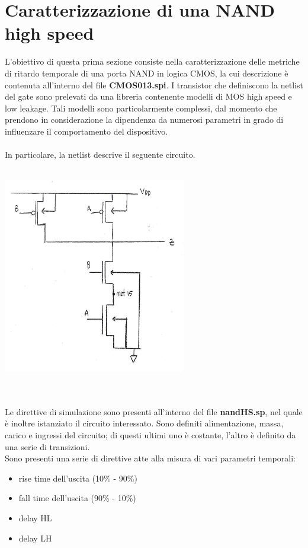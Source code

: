 \documentclass[11pt,  english, makeidx, a4paper, titlepage, oneside]{book}
\begin{document}
\section{Caratterizzazione di una NAND high speed}
L'obiettivo di questa prima sezione consiste nella caratterizzazione delle metriche di ritardo temporale di una porta NAND in logica CMOS, la cui descrizione è contenuta all'interno del file \textbf{CMOS013.spi}.
I transistor che definiscono la netlist del gate sono prelevati da una libreria contenente modelli di MOS high speed e low leakage. Tali modelli sono particolarmente complessi, dal momento che prendono in considerazione la dipendenza da numerosi parametri in grado di influenzare il comportamento del dispositivo.
\\\\
In particolare, la netlist descrive il seguente circuito.
\\\\
\centerline{\includegraphics[width=8cm]{./img/Lab_5/nand_netlist.jpg}}
\\\\
Le direttive di simulazione sono presenti all'interno del file \textbf{nandHS.sp}, nel quale è inoltre istanziato il circuito interessato. Sono definiti alimentazione, massa, carico e ingressi del circuito; di questi ultimi uno è costante, l'altro è definito da una serie di transizioni.
\\
Sono presenti una serie di direttive atte alla misura di vari parametri temporali:
\begin{itemize}
\item rise time dell'uscita (10\% - 90\%)
\item fall time dell'uscita (90\% - 10\%)
\item delay HL
\item delay LH
\end{itemize}
\end{document}
